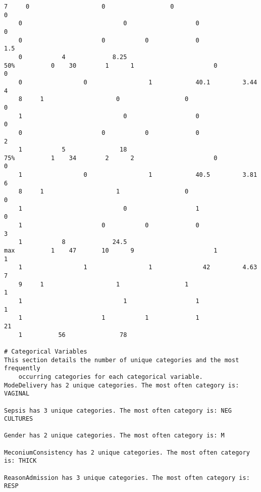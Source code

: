\documentclass[11pt]{article}
\begin{document}
\begin{Verbatim}[tabsize=4]
	7     0                    0                  0                             0
	0                            0                   0                           0
	0                      0           0             0                  1.5
	0           4             8.25
50%          0    30        1      1                      0                 0
	0                 0                 1            40.1         3.44       4
	8     1                    0                  0                             0
	1                            0                   0                           0
	0                      0           0             0                    2
	1           5               18
75%          1    34        2      2                      0                 0
	1                 0                 1            40.5         3.81       6
	8     1                    1                  0                             0
	1                            0                   1                           0
	1                      0           0             0                    3
	1           8             24.5
max          1    47       10      9                      1                 1
	1                 1                 1              42         4.63       7
	9     1                    1                  1                             1
	1                            1                   1                           1
	1                      1           1             1                   21
	1          56               78

# Categorical Variables
This section details the number of unique categories and the most frequently
	occurring categories for each categorical variable.
ModeDelivery has 2 unique categories. The most often category is: VAGINAL

Sepsis has 3 unique categories. The most often category is: NEG CULTURES

Gender has 2 unique categories. The most often category is: M

MeconiumConsistency has 2 unique categories. The most often category is: THICK

ReasonAdmission has 3 unique categories. The most often category is: RESP


\end{Verbatim}
\end{document}
